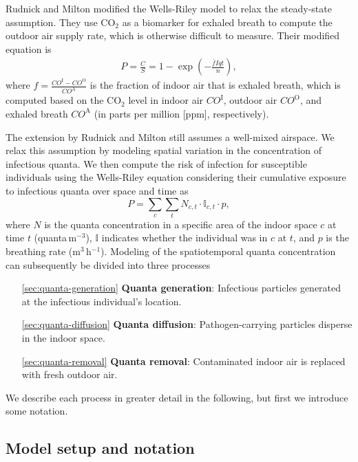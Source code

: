 \documentclass[fleqn,11pt]{wlscirep_supp}
\begin{document}
Rudnick and Milton\cite{Rudnick2003IndoorAir} modified the Wells-Riley model to relax the steady-state assumption. They use CO$_2$ as a biomarker for exhaled breath to compute the outdoor air supply rate, which is otherwise difficult to measure. Their modified equation is
\begin{align}
    P = \frac{C}{S} = 1 - \exp \left(-\frac{\bar{f}Iqt}{n}\right),
\end{align}
where $f = \frac{CO^{\text{I}}-CO^{\text{O}}}{CO^{\text{A}}}$ is the fraction of indoor air that is exhaled breath, which is computed based on the CO$_2$ level in indoor air $CO^{\text{I}}$, outdoor air $CO^{\text{O}}$, and exhaled breath $CO^{\text{A}}$ (in parts per million [ppm], respectively). 

The extension by Rudnick and Milton still assumes a well-mixed airspace. We relax this assumption by modeling spatial variation in the concentration of infectious quanta. We then compute the risk of infection for susceptible individuals using the Wells-Riley equation considering their cumulative exposure to infectious quanta over space and time as 
\begin{equation}\label{eq:spattemp-P}
    P = \sum_c \sum_t N_{c,t} \cdot \mathbb{I}_{c,t} \cdot p,
\end{equation}
where $N$ is the quanta concentration in a specific area of the indoor space $c$ at time $t$ (quanta\,m$^{-3}$), $\mathbb{I}$ indicates whether the individual was in $c$ at $t$, and $p$ is the breathing rate (m$^3$\,h$^{-1}$). Modeling of the spatiotemporal quanta concentration can subsequently be divided into three processes
\begin{itemize}
    \item[\ref{sec:quanta-generation}] \textbf{Quanta generation}: Infectious particles generated at the infectious individual's location. 
    \item[\ref{sec:quanta-diffusion}] \textbf{Quanta diffusion}: Pathogen-carrying particles disperse in the indoor space. 
    \item[\ref{sec:quanta-removal}] \textbf{Quanta removal}: Contaminated indoor air is replaced with fresh outdoor air. 
\end{itemize}
We describe each process in greater detail in the following, but first we introduce some notation. 

\subsection{Model setup and notation}
\end{document}
